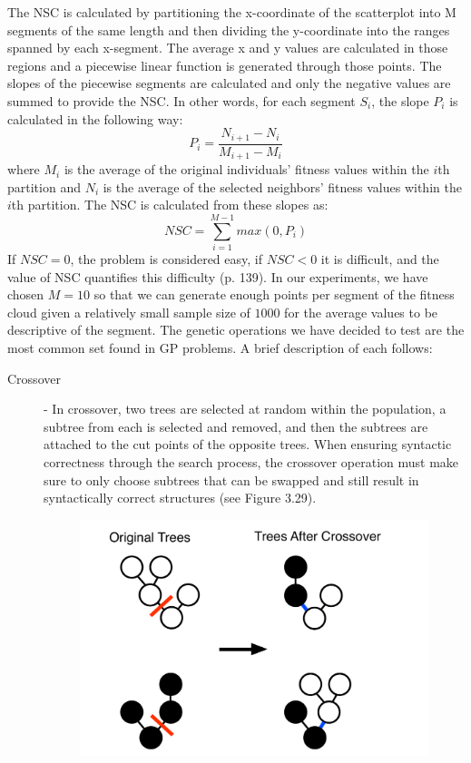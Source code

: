 \documentclass[a4paper,12pt]{report} 	%
\numberwithin{figure}{chapter}
\numberwithin{table}{chapter}
\numberwithin{equation}{chapter}
\begin{document}
\begin{flushleft}
The NSC is calculated by partitioning the x-coordinate of the scatterplot into M segments of the same length and then dividing the y-coordinate into the ranges spanned by each x-segment. The average x and y values are calculated in those regions and a piecewise linear function is generated through those points. The slopes of the piecewise segments are calculated and only the negative values are summed to provide the NSC. In other words, for each segment $S_i$, the slope $P_i$ is calculated in the following way:
\begin{equation}
P_i = \frac{N_{i+1}-N_i}{M_{i+1}-M_i}
\end{equation}
where $M_i$ is the average of the original individuals' fitness values within the $i$th partition and $N_i$ is the average of the selected neighbors' fitness values within the $i$th partition. The NSC is calculated from these slopes as:
\begin{equation}
NSC = \sum_{i=1}^{M-1} max(0, P_i)
\end{equation}
If $NSC = 0$, the problem is considered easy, if $NSC < 0$ it is difficult, and the value of NSC quantifies this difficulty (p. 139). In our experiments, we have chosen $M=10$ so that we can generate enough points per segment of the fitness cloud given a relatively small sample size of $1000$ for the average values to be descriptive of the segment.
The genetic operations we have decided to test are the most common set found in GP problems. A brief description of each follows:
\begin{description}
\item [Crossover] - In crossover, two trees are selected at random within the population, a subtree from each is selected and removed, and then the subtrees are attached to the cut points of the opposite trees. When ensuring syntactic correctness through the search process, the crossover operation must make sure to only choose subtrees that can be swapped and still result in syntactically correct structures (see Figure 3.29). 
\begin{figure}[h!]
\begin{center}
\includegraphics[scale=0.5]{Crossover}

\end{center}
\end{figure}
\end{description}
\end{flushleft}
\end{document}
